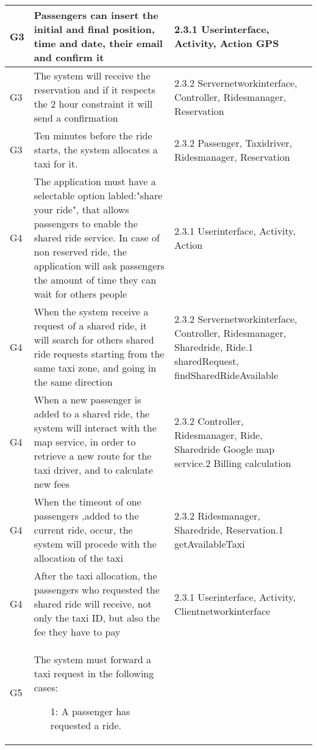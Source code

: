 \begin{center}
\begin{longtable}{| m{2cm} | m{6cm} | m{5cm} | }
    G3& Passengers can insert the initial and final position, time and date, their email and confirm it & 2.3.1 Userinterface, Activity, Action \newline 2.1 GPS\\ \hline
    G3&The system will receive the reservation and if it respects the 2 hour constraint it will send a confirmation & 2.3.2 Servernetworkinterface, Controller, Ridesmanager, Reservation \\ \hline
    G3&Ten minutes before the ride starts, the system allocates a taxi for it.  & 2.3.2 Passenger, Taxidriver, Ridesmanager, Reservation\\ \hline
    G4&The application must have a selectable option labled:"share your ride", that allows passengers to enable the shared 
	ride service. In case of non reserved ride, the application will ask passengers the amount of time they can wait for others people  & 2.3.1 Userinterface, Activity, Action \\ \hline
    G4& When the system receive a request of a shared ride, it will search for others shared ride requests starting from the same
	taxi zone, and going in the same direction & 2.3.2 Servernetworkinterface, Controller, Ridesmanager, Sharedride, Ride\newline
						      3.2.1 sharedRequest, findSharedRideAvailable\\ \hline
    G4& When a new passenger is added to a shared ride, the system will interact with the map service, in order to 
	retrieve a new route for the taxi driver, and to calculate new fees & 2.3.2 Controller, Ridesmanager, Ride, Sharedride\newline
										2.5 Google map service\newline
										3.2.2 Billing calculation\\ \hline
    G4& When the timeout of one passengers ,added to the current ride, occur, the system will procede with the allocation of the taxi & 2.3.2 Ridesmanager, Sharedride, Reservation\newline
																	  3.2.1 getAvailableTaxi\\ \hline
    G4& After the taxi allocation, the passengers who requested the shared ride will receive, not only the taxi ID, but also 
	the fee they have to pay & 2.3.1 Userinterface, Activity, Clientnetworkinterface\\ \hline
    G5& The system must forward a taxi request in the following cases:
	  \begin{itemize}
	   \item [1:] A passenger has requested a ride.

\end{itemize}
\end{longtable}
\end{center}
